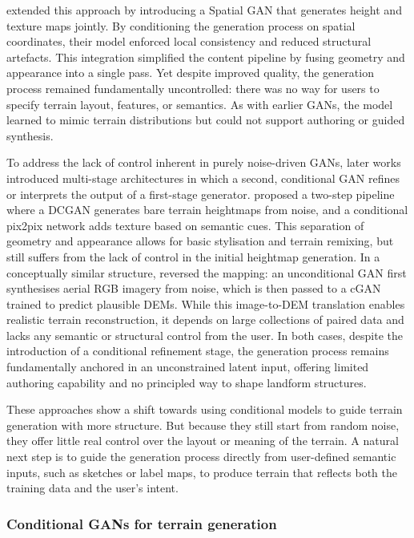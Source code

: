 \citep{Spick2019} extended this approach by introducing a Spatial GAN that generates height and texture maps jointly. By conditioning the generation process on spatial coordinates, their model enforced local consistency and reduced structural artefacts. This integration simplified the content pipeline by fusing geometry and appearance into a single pass. Yet despite improved quality, the generation process remained fundamentally uncontrolled: there was no way for users to specify terrain layout, features, or semantics. As with earlier GANs, the model learned to mimic terrain distributions but could not support authoring or guided synthesis.

To address the lack of control inherent in purely noise-driven GANs, later works introduced multi-stage architectures in which a second, conditional GAN refines or interprets the output of a first-stage generator. \citep{Beckham2017} proposed a two-step pipeline where a DCGAN generates bare terrain heightmaps from noise, and a conditional pix2pix network adds texture based on semantic cues. This separation of geometry and appearance allows for basic stylisation and terrain remixing, but still suffers from the lack of control in the initial heightmap generation. In a conceptually similar structure, \citep{Panagiotou2020} reversed the mapping: an unconditional GAN first synthesises aerial RGB imagery from noise, which is then passed to a cGAN trained to predict plausible DEMs. While this image-to-DEM translation enables realistic terrain reconstruction, it depends on large collections of paired data and lacks any semantic or structural control from the user. In both cases, despite the introduction of a conditional refinement stage, the generation process remains fundamentally anchored in an unconstrained latent input, offering limited authoring capability and no principled way to shape landform structures.

These approaches show a shift towards using conditional models to guide terrain generation with more structure. But because they still start from random noise, they offer little real control over the layout or meaning of the terrain. A natural next step is to guide the generation process directly from user-defined semantic inputs, such as sketches or label maps, to produce terrain that reflects both the training data and the user's intent.


\subsubsection{Conditional GANs for terrain generation}
\label{sec:coral-island-sota-cGAN}

